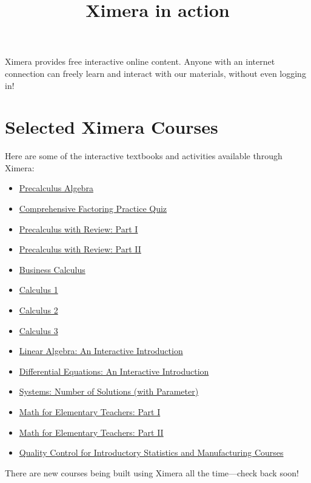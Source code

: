 \documentclass{ximera}
\title{Ximera in action}
\begin{document}
\begin{abstract}
\end{abstract}
\maketitle

Ximera provides free interactive online content. Anyone with an internet
connection can freely learn and interact with our materials, without
even logging in!

\section*{Selected Ximera Courses}

Here are some of the interactive textbooks and activities available
through Ximera:

\begin{itemize}
  \item \href{https://go.osu.edu/prca}{Precalculus Algebra}
  \item \href{https://go.osu.edu/cfa}{Comprehensive Factoring Practice Quiz}
  \item \href{https://go.osu.edu/pcr}{Precalculus with Review: Part I}
  \item \href{https://go.osu.edu/pcr2}{Precalculus with Review: Part II}
  \item \href{https://go.osu.edu/bca}{Business Calculus}
  \item \href{https://go.osu.edu/mc1}{Calculus 1}
  \item \href{https://go.osu.edu/mc2}{Calculus 2}
  \item \href{https://go.osu.edu/mc3}{Calculus 3}
  \item \href{https://go.osu.edu/ila}{Linear Algebra: An Interactive Introduction}
  \item \href{https://go.osu.edu/idiffeq}{Differential Equations: An Interactive Introduction}
  \item \href{https://go.osu.edu/mepr}{Systems: Number of Solutions (with Parameter)}
  \item \href{https://go.osu.edu/met1}{Math for Elementary Teachers: Part I}
  \item \href{https://go.osu.edu/met2}{Math for Elementary Teachers: Part II}
  \item \href{https://go.osu.edu/qcst}{Quality Control for Introductory Statistics and Manufacturing Courses}
\end{itemize}

There are new courses being built using Ximera all the time---check back soon!
\end{document}
